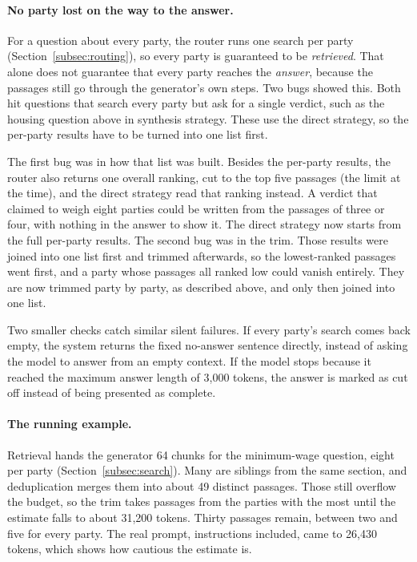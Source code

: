 \paragraph{No party lost on the way to the answer.} For a question about every
party, the router runs one search per party (Section~\ref{subsec:routing}), so
every party is guaranteed to be \emph{retrieved}. That alone does not
guarantee that every party reaches the \emph{answer}, because the passages
still go through the generator's own steps. Two bugs showed this. Both hit
questions that search every party but ask for a single verdict, such as the
housing question above in synthesis strategy. These use the direct strategy, so the per-party results
have to be turned into one list first.

The first bug was in how that list was built. Besides the per-party results,
the router also returns one overall ranking, cut to the top five passages
(the limit at the time), and the direct strategy read that ranking instead. A
verdict that claimed to weigh eight parties could be written from the passages
of three or four, with nothing in the answer to show it. The direct strategy
now starts from the full per-party results. The second bug was in the trim.
Those results were joined into one list first and trimmed afterwards, so the
lowest-ranked passages went first, and a party whose passages all ranked low
could vanish entirely. They are now trimmed party by party, as described above,
and only then joined into one list.

Two smaller checks catch similar silent failures. If every party's search comes
back empty, the system returns the fixed no-answer sentence directly, instead
of asking the model to answer from an empty context. If the model stops because
it reached the maximum answer length of 3,000 tokens, the answer is marked as
cut off instead of being presented as complete.

\paragraph{The running example.} Retrieval hands the generator 64 chunks for
the minimum-wage question, eight per party (Section~\ref{subsec:search}). Many
are siblings from the same section, and deduplication merges them into about
49 distinct passages. Those still overflow the budget, so the trim takes
passages from the parties with the most until the estimate falls to about
31,200 tokens. Thirty passages remain, between two and five for every party.
The real prompt, instructions included, came to 26,430 tokens, which shows how
cautious the estimate is.

